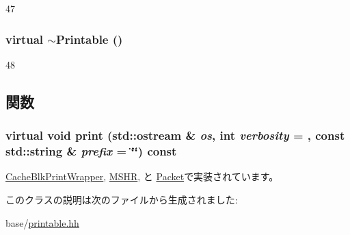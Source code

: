 \begin{DoxyCode}
47 {}
\end{DoxyCode}
\hypertarget{classPrintable_a8ce398facea289d7575cd064db1b5d9b}{
\subsubsection[{$\sim$Printable}]{\setlength{\rightskip}{0pt plus 5cm}virtual $\sim${\bf Printable} ()}}
\label{classPrintable_a8ce398facea289d7575cd064db1b5d9b}



\begin{DoxyCode}
48 {}
\end{DoxyCode}


\subsection{関数}
\hypertarget{classPrintable_a3be2c5a60e9670becc3259fc689833c5}{
\subsubsection[{print}]{\setlength{\rightskip}{0pt plus 5cm}virtual void print (std::ostream \& {\em os}, \/  int {\em verbosity} = {}, \/  const std::string \& {\em prefix} = {\ttfamily \char`\"{}\char`\"{}}) const}}
\label{classPrintable_a3be2c5a60e9670becc3259fc689833c5}


\hyperlink{classCacheBlkPrintWrapper_ae31e5ec0b459f751b386d17dd75855d1}{CacheBlkPrintWrapper}, \hyperlink{classMSHR_ad5a464e147506af89ea2778d731fe46f}{MSHR}, と \hyperlink{classPacket_ae31e5ec0b459f751b386d17dd75855d1}{Packet}で実装されています。

このクラスの説明は次のファイルから生成されました:\begin{DoxyCompactItemize}
\item 
base/\hyperlink{printable_8hh}{printable.hh}\end{DoxyCompactItemize}
